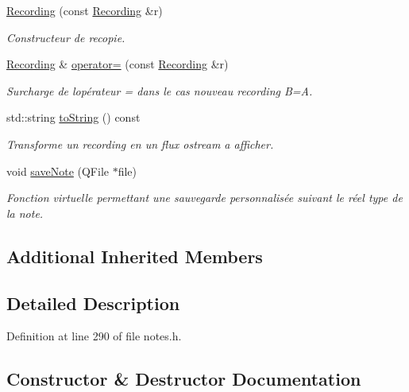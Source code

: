 \begin{DoxyCompactItemize}
\hyperlink{class_recording_ab354d60b8ecb06699378a849f6143ac6}{Recording} (const \hyperlink{class_recording}{Recording} \&r)
\begin{DoxyCompactList}\small\item\em Constructeur de recopie. \end{DoxyCompactList}\item 
\hyperlink{class_recording}{Recording} \& \hyperlink{class_recording_ac5c7522d695c8a657f5e801df97a9e06}{operator=} (const \hyperlink{class_recording}{Recording} \&r)
\begin{DoxyCompactList}\small\item\em Surcharge de l\textquotesingle{}opérateur = dans le cas nouveau recording B=A. \end{DoxyCompactList}\item 
std\+::string \hyperlink{class_recording_a9f403a39bec2db40c9171a6c3a20942d}{to\+String} () const
\begin{DoxyCompactList}\small\item\em Transforme un recording en un flux ostream a afficher. \end{DoxyCompactList}\item 
void \hyperlink{class_recording_a99e10c8a8c13bce5f70195b6c30a1cc9}{save\+Note} (Q\+File $\ast$file)
\begin{DoxyCompactList}\small\item\em Fonction virtuelle permettant une sauvegarde personnalisée suivant le réel type de la note. \end{DoxyCompactList}\end{DoxyCompactItemize}
\subsection*{Additional Inherited Members}


\subsection{Detailed Description}


Definition at line 290 of file notes.\+h.



\subsection{Constructor \& Destructor Documentation}
\mbox{\label{class_recording_a2e3359660cd7573807fb46c15daf4e78}} 
